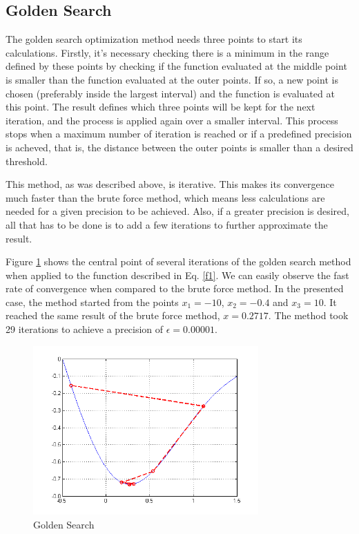 \documentclass[journal]{IEEEtran}
\begin{document}
\subsection{Golden Search}

The golden search optimization method needs three points to start its calculations. Firstly, it's necessary checking there is a minimum in the range defined by these points by checking if the function evaluated at the middle point is smaller than the function evaluated at the outer points. If so, a new point is chosen (preferably inside the largest interval) and the function is evaluated at this point. The result defines which three points will be kept for the next iteration, and the process is applied again over a smaller interval. This process stops when a maximum number of iteration is reached or if a predefined precision is acheved, that is, the distance between the outer points is smaller than a desired threshold.

 This method, as was described above, is iterative. This makes its convergence much faster than the brute force method, which means less calculations are needed for a given precision to be achieved. Also, if a greater precision is desired, all that has to be done is to add a few iterations to further approximate the result.

Figure \ref{figGS} shows the central point of several iterations of the golden search method when applied to the function described in Eq. \ref{f1}. We can easily observe the fast rate of convergence when compared to the brute force method. In the presented case, the method started from the points $x_1=-10$, $x_2=-0.4$ and $x_3=10$. It reached the same result of the brute force method, $x = 0.2717$. The method took 29 iterations to achieve a precision of $\epsilon = 0.00001$.

\begin{figure}[H]
\centering
\includegraphics[width=3.4in]{figures/1d-goldenSearch.png}
\caption{Golden Search}
\label{figGS}
\end{figure}
\end{document}
